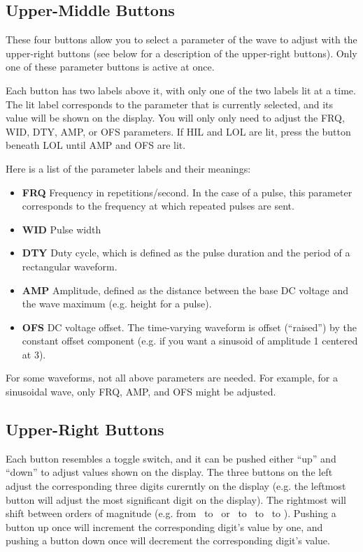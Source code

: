 \documentclass{article}
\begin{document}
\subsection{Upper-Middle Buttons}
These four buttons allow you to select a parameter of the wave to adjust with the upper-right buttons (see below for a description of the upper-right buttons). Only one of these parameter buttons is active at once. 

Each button has two labels above it, with only one of the two labels lit at a time. The lit label corresponds to the parameter that is currently selected, and its value will be shown on the display. You will only only need to adjust the FRQ, WID, DTY, AMP, or OFS parameters. If HIL and LOL are lit, press the button beneath LOL until AMP and OFS are lit. 

Here is a list of the parameter labels and their meanings:
\begin{itemize}
\item \textbf{FRQ} Frequency in repetitions/second. In the case of a pulse, this parameter corresponds to the frequency at which repeated pulses are sent. 
\item \textbf{WID} Pulse width
\item \textbf{DTY} Duty cycle, which is defined as the pulse duration and the period of a rectangular waveform.
\item \textbf{AMP} Amplitude, defined as the distance between the base DC voltage and the wave maximum (e.g. height for a pulse).
\item \textbf{OFS} DC voltage offset. The time-varying waveform is offset (``raised'') by the constant offset component (e.g. if you want a sinusoid of amplitude \unit{1}{\volt} centered at \unit{3}{\volt}).
\end{itemize}

For some waveforms, not all above parameters are needed. For example, for a sinusoidal wave, only FRQ, AMP, and OFS might be adjusted.
 
\subsection{Upper-Right Buttons}
Each button resembles a toggle switch, and it can be pushed either ``up'' and ``down'' to adjust values shown on the display. The three buttons on the left adjust the corresponding three digits curerntly on the display (e.g. the leftmost button will adjust the most significant digit on the display). The rightmost will shift between orders of magnitude (e.g. from \milli\volt\ to \volt\ or \milli\hertz\ to \hertz\ to \kilo\hertz\ to \mega\hertz). Pushing a button up once will increment the corresponding digit's value by one, and pushing a button down once will decrement the corresponding digit's value.
\end{document}
